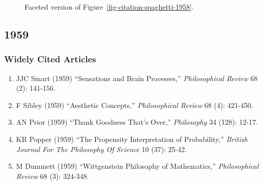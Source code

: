 \documentclass[
  10pt,
  letterpaper,
  DIV=11,
  numbers=noendperiod,
  twoside]{scrartcl}
\providecommand{\tightlist}{%
  \setlength{\itemsep}{0pt}\setlength{\parskip}{0pt}}\usepackage{longtable,booktabs,array}
\begin{document}
\begin{figure}


\caption{\label{fig-citation-facet-1958}Faceted version of
Figure~\ref{fig-citation-spaghetti-1958}.}

\end{figure}%

\newpage

\subsection{1959}\label{sec-s1959}

\subsubsection*{Widely Cited Articles}\label{widely-cited-articles-3}

\begin{enumerate}
\def\labelenumi{\arabic{enumi}.}
\tightlist
\item
  JJC Smart (1959) ``Sensations and Brain Processes,''
  \emph{Philosophical Review} 68 (2): 141-156.
\item
  F Sibley (1959) ``Aesthetic Concepts,'' \emph{Philosophical Review} 68
  (4): 421-450.
\item
  AN Prior (1959) ``Thank Goodness That's Over,'' \emph{Philosophy} 34
  (128): 12-17.
\item
  KR Popper (1959) ``The Propensity Interpretation of Probability,''
  \emph{British Journal For The Philosophy Of Science} 10 (37): 25-42.
\item
  M Dummett (1959) ``Wittgenstein Philosophy of Mathematics,''
  \emph{Philosophical Review} 68 (3): 324-348.
\end{enumerate}
\end{document}
